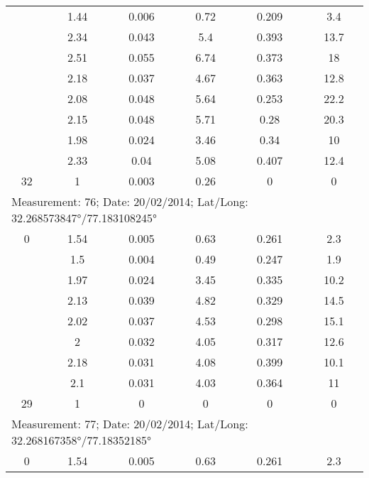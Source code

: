 \begin{longtable}{cccccc}
		& 1.44  & 0.006 & 0.72  & 0.209 & 3.4 \\
		
		& 2.34  & 0.043 & 5.4   & 0.393 & 13.7 \\
		
		& 2.51  & 0.055 & 6.74  & 0.373 & 18 \\
		
		& 2.18  & 0.037 & 4.67  & 0.363 & 12.8 \\
		
		& 2.08  & 0.048 & 5.64  & 0.253 & 22.2 \\
		
		& 2.15  & 0.048 & 5.71  & 0.28  & 20.3 \\
		
		& 1.98  & 0.024 & 3.46  & 0.34  & 10 \\
		
		& 2.33  & 0.04  & 5.08  & 0.407 & 12.4 \\
		
		32    & 1     & 0.003 & 0.26  & 0     & 0 \\
		\midrule
		\multicolumn{6}{l}{Measurement: 76; Date: 20/02/2014;
			Lat/Long: 32.268573847°/77.183108245°} \\		
		\midrule
		0     & 1.54  & 0.005 & 0.63  & 0.261 & 2.3 \\
		
		& 1.5   & 0.004 & 0.49  & 0.247 & 1.9 \\
		
		& 1.97  & 0.024 & 3.45  & 0.335 & 10.2 \\
		
		& 2.13  & 0.039 & 4.82  & 0.329 & 14.5 \\
		
		& 2.02  & 0.037 & 4.53  & 0.298 & 15.1 \\
		
		& 2     & 0.032 & 4.05  & 0.317 & 12.6 \\
		
		& 2.18  & 0.031 & 4.08  & 0.399 & 10.1 \\
		
		& 2.1   & 0.031 & 4.03  & 0.364 & 11 \\
		
		29    & 1     & 0     & 0     & 0     & 0 \\
		\midrule
		\multicolumn{6}{l}{Measurement: 77; Date: 20/02/2014;
			Lat/Long: 32.268167358°/77.18352185°} \\		
		\midrule
		0     & 1.54  & 0.005 & 0.63  & 0.261 & 2.3 \\
		

\end{longtable}
